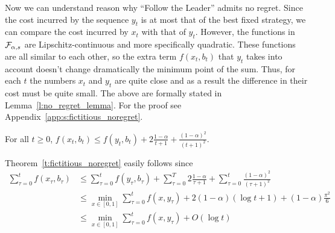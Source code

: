 Now we can understand reason why \enquote{Follow the Leader}
admits no regret. Since the cost incurred by the sequence $y_t$ is at most that
of the best fixed strategy, we can compare the cost incurred by $x_t$ with
that of $y_t$.  However, the functions in $\mathcal{F}_{\alpha,s}$ are
Lipschitz-continuous and more specifically quadratic.
These functions are all similar to each other, so the extra
term $f(x_t,b_t)$ that $y_t$ takes into account doesn't change
dramatically the minimum point of the sum. Thus, for each $t$ the
numbers $x_t$ and $y_t$ are quite close and as a result the
difference in their cost must be quite small. The above are
formally stated in Lemma~\ref{l:no_regret_lemma}. For the proof
see Appendix~\ref{app:s:fictitious_noregret}.
\begin{lemma}\label{l:no_regret_lemma}
  For all $t\geq 0$,
  \(
    f(x_t,b_t) \leq f(y_t,b_t) + 2\frac{1-\alpha}{t+1} +
    \frac{(1-\alpha)^2}{(t+1)^2}
  \).
\end{lemma}

Theorem~\ref{t:fictitious_noregret} easily follows since
\begin{align*}
  \sum_{\tau=0}^t f(x_\tau,b_\tau)
  &\leq
  \sum_{\tau=0}^t f(y_\tau,b_\tau) + \sum_{\tau=0}^T 2\frac{1-\alpha}{\tau+1} +
  \sum_{\tau=0}^t \frac{(1-\alpha)^2}{(\tau+1)^2}\\
  &\leq
  \min_{ x \in [0,1]} \sum_{\tau=0}^t f(x,y_\tau) +
  2(1-\alpha)(\log t + 1) + (1-\alpha)\frac{\pi^2}{6}\\
  &\leq
  \min_{ x \in [0,1]} \sum_{\tau=0}^t f(x,y_\tau) + O(\log t)
\end{align*}
